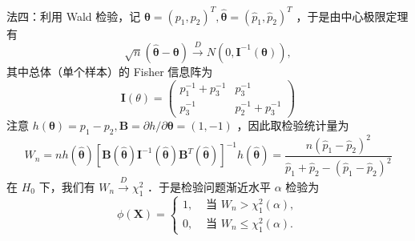 \documentclass[UTF8,openany]{book}
\begin{document}
	法四：利用 Wald 检验，记 $\boldsymbol{\theta}=\left(p_1, p_2\right)^{T}, \hat{\boldsymbol{\theta}}=\left(\hat{p}_1, \hat{p}_2\right)^{T}$ ，于是由中心极限定理有
	$$
	\sqrt{n}(\hat{\boldsymbol{\theta}}-\boldsymbol{\theta}) \xrightarrow{D} N\left(0, \boldsymbol{I}^{-1}(\boldsymbol{\theta})\right),
	$$
	其中总体（单个样本）的 Fisher 信息阵为
	$$
	\boldsymbol{I}(\theta)=\left(\begin{array}{cc}
		p_1^{-1}+p_3^{-1} & p_3^{-1} \\
		p_3^{-1} & p_2^{-1}+p_3^{-1}
	\end{array}\right)
	$$
	注意 $h(\boldsymbol{\theta})=p_1-p_2, \boldsymbol{B}=\partial h / \partial \boldsymbol{\theta}=(1,-1)$ ，因此取检验统计量为
	$$
	W_n=n h(\hat{\boldsymbol{\theta}})\left[\boldsymbol{B}(\hat{\boldsymbol{\theta}}) \boldsymbol{I}^{-1}(\hat{\boldsymbol{\theta}}) \boldsymbol{B}^{T}(\hat{\boldsymbol{\theta}})\right]^{-1} h(\hat{\boldsymbol{\theta}})=\frac{n\left(\hat{p}_1-\hat{p}_2\right)^2}{\hat{p}_1+\hat{p}_2-\left(\hat{p}_1-\hat{p}_2\right)^2}
	$$
	在 $H_0$ 下，我们有 $W_n \xrightarrow{D} \chi_1^2$ ．于是检验问题渐近水平 $\alpha$ 检验为
	$$
	\phi(\boldsymbol{X})= \begin{cases}1, & \text { 当 } W_n>\chi_1^2(\alpha), \\ 0, & \text { 当 } W_n \leq \chi_1^2(\alpha) .\end{cases}
	$$\\
	
	
	
\end{document}
